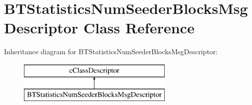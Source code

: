 \hypertarget{classBTStatisticsNumSeederBlocksMsgDescriptor}{}\section{B\+T\+Statistics\+Num\+Seeder\+Blocks\+Msg\+Descriptor Class Reference}
\label{classBTStatisticsNumSeederBlocksMsgDescriptor}
Inheritance diagram for B\+T\+Statistics\+Num\+Seeder\+Blocks\+Msg\+Descriptor\+:\begin{figure}[H]
\begin{center}
\leavevmode
\includegraphics[height=2.000000cm]{classBTStatisticsNumSeederBlocksMsgDescriptor}
\end{center}
\end{figure}
